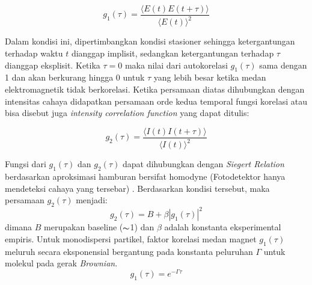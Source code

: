 \begin{equation}
    g_1 (\tau) = \frac{\langle E(t) E(t+\tau)\rangle}{\langle E(t)\rangle^2}
\end{equation}

Dalam kondisi ini, dipertimbangkan kondisi stasioner sehingga ketergantungan terhadap waktu
${t}$ dianggap implisit, sedangkan ketergantungan terhadap ${\tau}$ dianggap eksplisit.
Ketika ${\tau = 0}$ maka nilai dari autokorelasi ${g_1(\tau)}$ sama dengan 1 dan akan
berkurang hingga 0 untuk ${\tau}$ yang lebih besar ketika medan elektromagnetik tidak
berkorelasi. Ketika persamaan diatas dihubungkan dengan intensitas cahaya didapatkan
persamaan orde kedua temporal fungsi korelasi atau bisa disebut juga \textit{intensity
correlation function} yang dapat ditulis:

\begin{equation}
    g_2 (\tau) = \frac{\langle I(t) I(t+\tau)\rangle}{\langle I(t)\rangle^2}
\end{equation}


Fungsi dari ${g_1(\tau)}$ dan ${g_2(\tau)}$ dapat dihubungkan dengan \textit{Siegert Relation}
\cite{Siegert1943}
berdasarkan aproksimasi hamburan bersifat homodyne (Fotodetektor hanya mendeteksi cahaya
yang tersebar) \cite{Stetefeld2016}. Berdasarkan kondisi tersebut, maka persamaan
${g_2(\tau)}$ menjadi:
\begin{equation}
    g_2(\tau) = B + \beta|g_1(\tau)|^2
\end{equation}
\noindent
dimana ${B}$ merupakan baseline (${\thicksim}$1) dan ${\beta}$ adalah konstanta eksperimental empiris.
Untuk monodispersi partikel, faktor korelasi medan magnet ${g_1(\tau)}$ meluruh secara
eksponensial bergantung pada konstanta peluruhan ${\Gamma}$ untuk molekul pada gerak
\textit{Brownian}.
\begin{equation}
    g_1(\tau)=e^{-\Gamma \tau}
    \label{eq:g1tau}
\end{equation}

